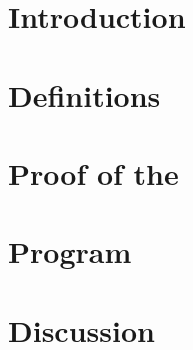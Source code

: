 \documentclass[a4,fleqn]{article}
\begin{document}
\section{Introduction}


\section{Definitions}




\section{Proof of the \MWT}


\section{Program}


\section{Discussion}

\end{document}
